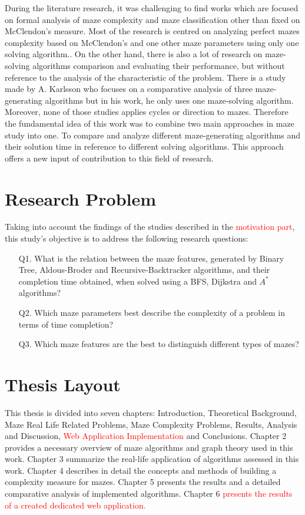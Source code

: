 During the literature research, it was challenging to find works which are focused on formal analysis of maze complexity and maze classification other than fixed on 
McClendon's measure. Most of the research is centred on analyzing perfect mazes complexity based on McClendon's and one other maze parameters using only one solving algorithm.\cite{2,4}.
On the other hand, there is also a lot of research on maze-solving algorithms comparison and evaluating their performance, but without reference to the analysis of the 
characteristic of the problem\cite{3}. There is a study made by A. Karlsson \cite{1} who focuses on a comparative analysis of three maze-generating algorithms
but in his work, he only uses one maze-solving algorithm. Moreover, none of those studies applies cycles or direction to mazes. Therefore the fundamental idea of this work was to combine two main approaches in maze study into one. To compare and analyze different 
maze-generating algorithms and their solution time in reference to different solving algorithms. This approach offers a new input of contribution to this field of research.

\section{Research Problem}
Taking into account the findings of the studies described in the \textcolor{red}{motivation part}, this study's objective is to address the following research questions:\\
\begin{enumerate}
    \item [Q1.] What is the relation between the maze features, generated by Binary Tree, Aldous-Broder and Recursive-Backtracker algorithms,
     and their completion time obtained, when solved using a BFS, Dijkstra and $A^*$ algorithms?
    \item [Q2.] Which maze parameters best describe the complexity of a problem in terms of time completion?
    \item [Q3.] Which maze features are the best to distinguish different types of mazes?
\end{enumerate}
\section{Thesis Layout}
This thesis is divided into seven chapters: Introduction, Theoretical Background, Maze Real Life Related Problems, 
Maze Complexity Problems, Results, Analysis and Discussion, \textcolor{red}{Web Application Implementation} and Conclusions.
Chapter 2 provides a necessary overview of maze algorithms and graph theory used in this work. Chapter 3 summarize the real-life application of algorithms 
assessed in this work. Chapter 4 describes in detail the concepts and methods of building a complexity measure for mazes. Chapter 5 presents the 
results and a detailed comparative analysis of implemented algorithms. Chapter 6 \textcolor{red}{presents the results of a created dedicated web application.}
